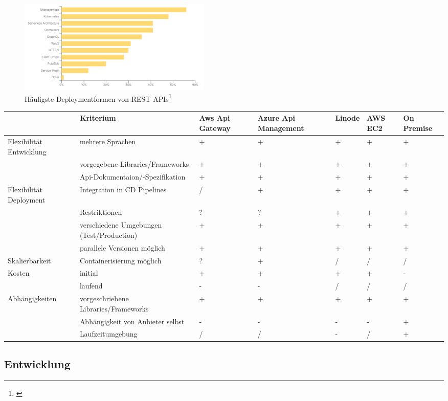 \documentclass[notitlepage, hidelinks]{article}
\begin{document}
\begin{figure}[H]
\centering
  \includegraphics[width=350px]{images/stateofapideploymentcontainers.png}
  \caption{Häufigste Deploymentformen von REST APIs\protect\footnote{\cite{api-postman}}}
  \label{stateofapideploymentcontainers}
\end{figure}


\begin{tabular}{|L{2cm}|L{3.2cm}|L{1.5cm}|L{1.5cm}|L{1.5cm}|L{1.5cm}|L{1.5cm}|}
\hline
& Kriterium & Aws Api Gateway & Azure Api Management & Linode & AWS EC2 & On Premise \\ \hline
Flexibilität Entwicklung & mehrere Sprachen & + & + & + & + & + \\ 
& vorgegebene Libraries/Frameworks & + & + & + & + & + \\ 
& Api-Dokumentaion/-Spezifikation & + & + & + & + & + \\ \hline
Flexibilität Deployment & Integration in CD Pipelines & / & + & + & + & + \\ 
& Restriktionen & ? & ? & + & + & + \\ 
& verschiedene Umgebungen (Test/Production) & + & + & + & + & + \\ 
& parallele Versionen möglich & + & + & + & + & + \\ \hline
Skalierbarkeit & Containerisierung möglich & ? & + & / & / & / \\ 
Kosten & initial & + & + & + & + & - \\ 
& laufend & - & - & / & / & / \\ \hline
Abhängigkeiten & vorgeschriebene Libraries/Frameworks & + & + & + & + & + \\ 
& Abhängigkeit von Anbieter selbst & - & - & - & - & + \\ 
& Laufzeitumgebung & / & / & - & / & + \\ \hline
\end{tabular}

\subsection{Entwicklung}
\end{document}
